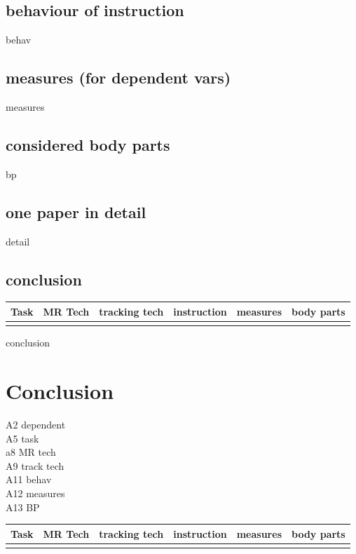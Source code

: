 \subsection{behaviour of instruction}
behav
\subsection{measures (for dependent vars)}
measures
\subsection{considered body parts}
bp
\subsection{one paper in detail}
detail
\subsection{conclusion}
\begin{table}[]
	\begin{tabular}{|l|l|l|l|l|l|}
		\hline
		Task & MR Tech & tracking tech & instruction & measures & body parts  \\ \hline
		&  &  &  &  &  \\ \hline
	\end{tabular}
\end{table}
conclusion

\section{Conclusion}
A2 dependent \markAtwoDependent \\
A5 task \markAfiveTask \\
a8 MR tech \markAeightMRtech \\
A9 track tech \markAnineTrackTech \\
A11 behav \markAelevenBehav \\
A12 measures \markAtwelveMeasures \\
A13 BP \markAonethreeBP \\
\begin{table}[]
	\begin{tabular}{|l|l|l|l|l|l|}
		\hline
		Task & MR Tech & tracking tech & instruction & measures & body parts  \\ \hline
		&  &  &  &  &  \\ \hline
	\end{tabular}
\end{table}

